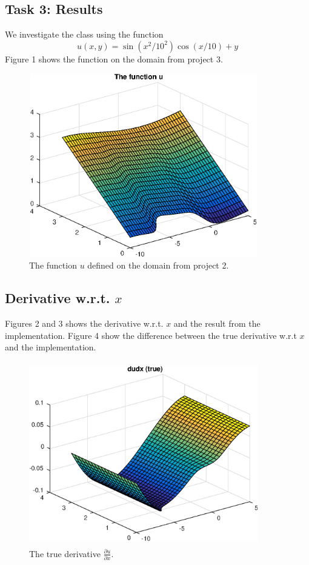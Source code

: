 \documentclass[a4paper,10pt]{article}
\begin{document}
\subsection*{Task 3: Results}
We investigate the class using the function
\begin{equation*}
  u(x,y) = \sin (x^2/10^2) \cos (x/10) + y
\end{equation*}
Figure 1 shows the function on the domain from project 3.
\begin{figure}[ht!]
  \centering
  \includegraphics[width = 10cm, height = 8cm]{ufctn}
  \begin{minipage}[t]{100mm}
    \caption{
      The function $u$ defined on the domain from project 2.
    }\label{FIG_jjj}
  \end{minipage}
\end{figure}

\subsection*{Derivative w.r.t. $x$}

Figures 2 and 3 shows the derivative w.r.t. $x$ and the result from the implementation.
Figure 4 show the difference between the true derivative w.r.t $x$ and the implementation.



\begin{figure}[ht]
  \centering
  \includegraphics[width = 10cm, height = 8cm]{dudx}
  \begin{minipage}[t]{100mm}
    \caption{
      The true derivative $\tfrac{\partial u}{\partial x}$.
    }\label{FIG_jjj}
  \end{minipage}
\end{figure}
\end{document}
